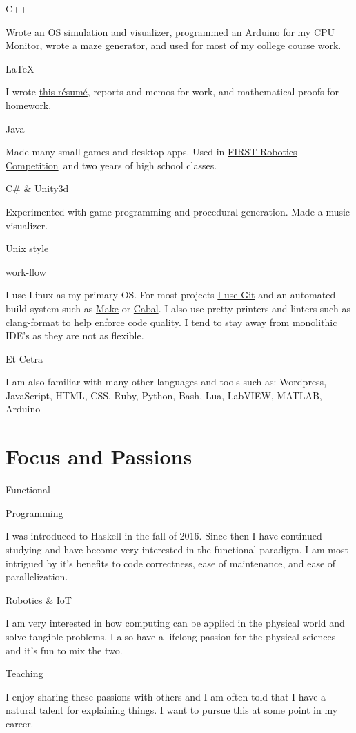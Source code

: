 \documentclass{article}
\newcommand{\jskill}[2]{
\noindent
\begin{minipage}[t]{.15\textwidth}
\hfill #1
\end{minipage}
\hspace{.05em}\vline\hspace{.05em}
\begin{minipage}[t]{.80\textwidth}
#2
\end{minipage}

\vspace{0.75em}}
\newcommand{\frc}{\href{https://www.firstinspires.org/robotics/frc}{FIRST Robotics Competition}}
\begin{document}
\jskill{C++}{Wrote an OS simulation and visualizer, \href{https://github.com/joshuatshaffer/retro-cpu-monitor/tree/master/arduino/retro_cpu_monitor_sketch}{programmed an Arduino for my CPU Monitor}, wrote a \href{https://github.com/joshuatshaffer/Command-Line-Maze}{maze generator}, and used for most of my college course work.}

\jskill{\LaTeX}{I wrote \href{https://github.com/joshuatshaffer/resume}{this r\'esum\'e}, reports and memos for work, and mathematical proofs for homework.}

\jskill{Java}{Made many small games and desktop apps. Used in \frc\ and two years of high school classes.}

\jskill{C\# \& Unity3d}{Experimented with game programming and procedural generation. Made a music visualizer.}

\jskill{Unix style 

\hfill work-flow}{I use Linux as my primary OS. For most projects \href{https://github/joshuatshaffer}{I use Git} and an automated build system such as \href{https://en.wikipedia.org/wiki/Make_(software)}{Make} or \href{https://www.haskell.org/cabal/}{Cabal}. I also use pretty-printers and linters such as \href{http://clang.llvm.org/docs/ClangFormat.html}{clang-format} to help enforce code quality. I tend to stay away from monolithic IDE's as they are not as flexible.}

\jskill{Et Cetra}{I am also familiar with many other languages and tools such as: Wordpress, JavaScript, HTML, CSS, Ruby, Python, Bash, Lua, LabVIEW, MATLAB, Arduino}

\section{Focus and Passions}

\jskill{Functional 

\hfill Programming} {I was introduced to Haskell in the fall of 2016. Since then I have continued studying and have become very interested in the functional paradigm. I am most intrigued by it's benefits to code correctness, ease of maintenance, and ease of parallelization.}

\jskill{Robotics \& IoT}{I am very interested in how computing can be applied in the physical world and solve tangible problems. I also have a lifelong passion for the physical sciences and it's fun to mix the two.}

\jskill{Teaching}{I enjoy sharing these passions with others and I am often told that I have a natural talent for explaining things. I want to pursue this at some point in my career.}
\end{document}

